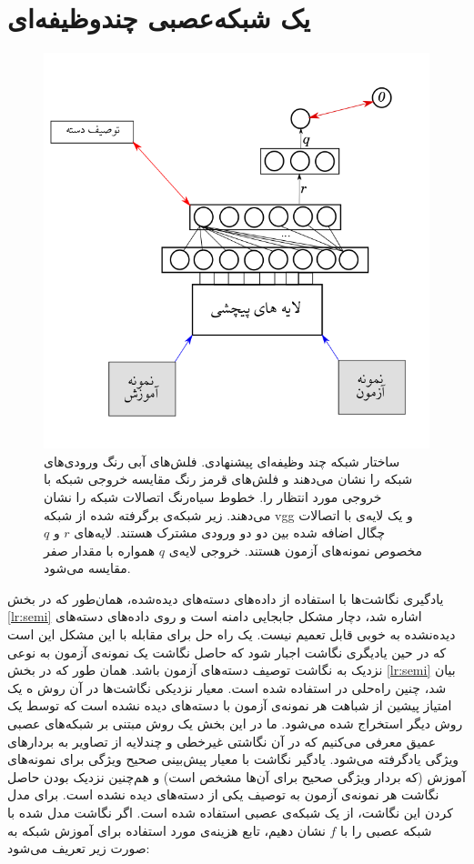 \section{یک شبکه‌عصبی چندوظیفه‌ای}\label{nn}
\begin{figure}[!t]
\centering
\includegraphics[width=0.85\linewidth]{images/net}
\caption[شبکه‌ی چندوظیفه‌ای پیشنهادی]{
ساختار شبکه چند وظیفه‌ای پیشنهادی. فلش‌های آبی رنگ ورودی‌های شبکه را نشان می‌دهند و فلش‌های قرمز رنگ مقایسه خروجی شبکه با خروجی مورد انتظار را. خطوط سیاه‌رنگ اتصالات شبکه‌ را نشان می‌دهند. زیر شبکه‌ی برگرفته شده از شبکه vgg و یک لایه‌ی با اتصالات چگال اضافه شده بین دو دو ورودی مشترک هستند. لایه‌های $r$ و $q$ مخصوص نمونه‌های آزمون هستند. خروجی لایه‌ی $q$ همواره با مقدار صفر مقایسه می‌شود.
}
\label{fig:nn2}
\end{figure}
یادگیری نگاشت‌ها با استفاده از داده‌های دسته‌های دیده‌شده، همان‌طور که در بخش \ref{lr:semi} اشاره شد، دچار مشکل جابجایی دامنه است و  روی داده‌های دسته‌های دیده‌نشده به خوبی قابل تعمیم نیست. یک راه حل برای مقابله با این مشکل این است که در حین یادیگری نگاشت اجبار شود که حاصل نگاشت یک نمونه‌ی آزمون به نوعی نزدیک به نگاشت توصیف دسته‌های آزمون باشد. همان ‌طور که در بخش
\ref{lr:semi}
بیان شد، چنین راه‌حلی در
\cite{Kodirov2015}
استفاده شده است. معیار نزدیکی نگاشت‌ها در آن روش ه یک امتیاز پیشین از شباهت هر نمونه‌ی آزمون با دسته‌های دیده نشده است که  توسط یک روش دیگر استخراج شده می‌شود. ما در این بخش یک روش مبتنی بر شبکه‌های عصبی عمیق معرفی می‌کنیم که در آن نگاشتی غیرخطی و چندلایه از تصاویر به بردارهای ویژگی یادگرفته می‌شود. یادگیر نگاشت با معیار پیش‌بینی صحیح ویژگی برای نمونه‌های آموزش (که بردار ویژگی صحیح برای آن‌ها مشخص است) و هم‌چنین نزدیک بودن حاصل نگاشت هر نمونه‌ی آزمون به توصیف یکی از دسته‌های دیده نشده است. برای مدل کردن این نگاشت، از یک شبکه‌ی عصبی استفاده شده است. اگر نگاشت مدل شده با شبکه عصبی را با $f$ نشان دهیم، تابع هزینه‌ی مورد استفاده برای آموزش شبکه به صورت زیر تعریف می‌شود:
